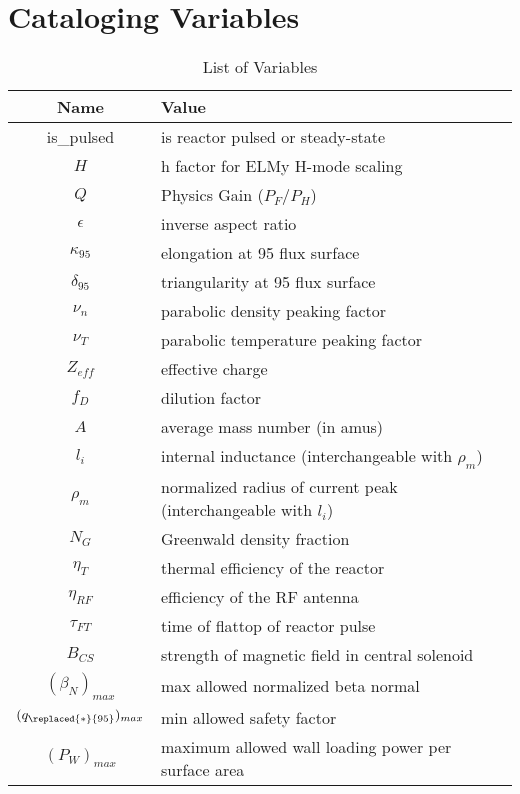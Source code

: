 \chapter{Cataloging  Variables}

\label{chapter:var_table}

\begin{table}[h]
\caption{List of  Variables}
\begin{tabular}{c|l}
\textbf{Name} & \textbf{Value} \\
\hline
is\_pulsed & is reactor pulsed or steady-state \\
$H$ & h factor for ELMy H-mode scaling \\
$Q$ & Physics Gain ($P_F/P_H$) \\
$\epsilon$ & inverse aspect ratio \\
$\kappa_{95}$ &  elongation at 95 flux surface \\
$\delta_{95}$ &  triangularity at 95 flux surface \\
$\nu_n$ &  parabolic density peaking factor \\
$\nu_T$ &  parabolic temperature peaking factor \\
$Z_{eff}$ & effective charge \\
$f_D$ & dilution factor \\
$A$ & average mass number (in amus) \\
$l_i$ & internal inductance (interchangeable with $\rho_m$) \\
$\rho_m$ & normalized radius of current peak (interchangeable with $l_i$) \\
$N_G$ & Greenwald density fraction \\
$\eta_T$ & thermal efficiency of the reactor \\
$\eta_{RF}$ &  efficiency of the RF antenna \\
$\tau_{FT}$ &  time of flattop of reactor pulse \\
$B_{CS}$ &  strength of magnetic field in central solenoid \\
$(\beta_N)_{max}$ &  max allowed normalized beta normal \\
$(q_{\replaced{*}{95}})_{max}$ &  min allowed safety factor \\
$(P_W)_{max}$ & maximum allowed wall loading power per surface area
\end{tabular}
\end{table}

